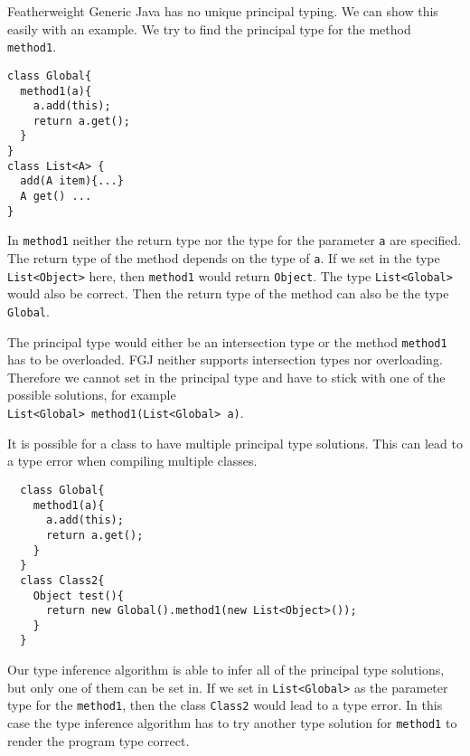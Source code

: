 Featherweight Generic Java has no unique principal typing.
We can show this easily with an example.
We try to find the principal type for the method \texttt{method1}.
\begin{lstlisting}
class Global{
  method1(a){
    a.add(this);
    return a.get();
  }
}
class List<A> {
  add(A item){...}
  A get() ...
}
\end{lstlisting}
In \texttt{method1} neither the return type nor the type for the parameter \texttt{a} are specified.
The return type of the method depends on the type of \texttt{a}.
If we set in the type \texttt{List<Object>} here, then \texttt{method1} would return \texttt{Object}.
The type \texttt{List<Global>} would also be correct.
Then the return type of the method can also be the type \texttt{Global}.

The principal type would either be an intersection type or the method \texttt{method1} has to be overloaded.
FGJ neither supports intersection types nor overloading.
Therefore we cannot set in the principal type and have to stick with one of the possible solutions,
for example\\
\texttt{List<Global> method1(List<Global> a)}.

It is possible for a class to have multiple principal type solutions.
This can lead to a type error when compiling multiple classes.
\begin{lstlisting}
  class Global{
    method1(a){
      a.add(this);
      return a.get();
    }
  }
  class Class2{
    Object test(){
      return new Global().method1(new List<Object>());
    }
  }
\end{lstlisting}
Our type inference algorithm is able to infer all of the principal type solutions, but only one of them can be set in.
If we set in \texttt{List<Global>} as the parameter type for the \texttt{method1},
then the class \texttt{Class2} would lead to a type error.
In this case the type inference algorithm has to try another type solution for \texttt{method1}
to render the program type correct.

